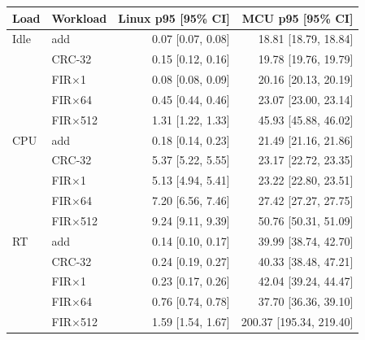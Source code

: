 \begin{tabular}{llrr}
\toprule
Load & Workload & Linux p95 [95\% CI] & MCU p95 [95\% CI] \\
\midrule
Idle & add & 0.07 [0.07, 0.08] & 18.81 [18.79, 18.84] \\
 & CRC-32 & 0.15 [0.12, 0.16] & 19.78 [19.76, 19.79] \\
 & FIR$\times$1 & 0.08 [0.08, 0.09] & 20.16 [20.13, 20.19] \\
 & FIR$\times$64 & 0.45 [0.44, 0.46] & 23.07 [23.00, 23.14] \\
 & FIR$\times$512 & 1.31 [1.22, 1.33] & 45.93 [45.88, 46.02] \\
\midrule
CPU & add & 0.18 [0.14, 0.23] & 21.49 [21.16, 21.86] \\
 & CRC-32 & 5.37 [5.22, 5.55] & 23.17 [22.72, 23.35] \\
 & FIR$\times$1 & 5.13 [4.94, 5.41] & 23.22 [22.80, 23.51] \\
 & FIR$\times$64 & 7.20 [6.56, 7.46] & 27.42 [27.27, 27.75] \\
 & FIR$\times$512 & 9.24 [9.11, 9.39] & 50.76 [50.31, 51.09] \\
\midrule
RT & add & 0.14 [0.10, 0.17] & 39.99 [38.74, 42.70] \\
 & CRC-32 & 0.24 [0.19, 0.27] & 40.33 [38.48, 47.21] \\
 & FIR$\times$1 & 0.23 [0.17, 0.26] & 42.04 [39.24, 44.47] \\
 & FIR$\times$64 & 0.76 [0.74, 0.78] & 37.70 [36.36, 39.10] \\
 & FIR$\times$512 & 1.59 [1.54, 1.67] & 200.37 [195.34, 219.40] \\
\bottomrule
\end{tabular}
